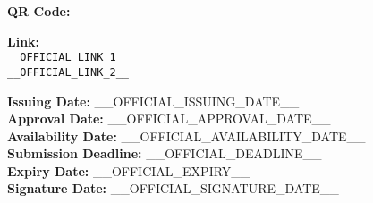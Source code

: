 \begin{tcolorbox}[colback=white, colframe=black, boxrule=0.5pt]
\noindent
\textbf{QR Code:} \\

\vspace{0.5cm}

\noindent
{\normalsize\textbf{Link:} }\\
\texttt{__OFFICIAL_LINK_1__} \\
\texttt{__OFFICIAL_LINK_2__} \\


\vspace{0.5cm}

\noindent

\begin{multicols}{2}
\normalsize
\textbf{Issuing Date:} __OFFICIAL_ISSUING_DATE__ \\
\textbf{Approval Date:} __OFFICIAL_APPROVAL_DATE__ \\
\textbf{Availability Date:} __OFFICIAL_AVAILABILITY_DATE__ \\

\textbf{Submission Deadline:} __OFFICIAL_DEADLINE__ \\
\textbf{Expiry Date:} __OFFICIAL_EXPIRY__ \\
\textbf{Signature Date:} __OFFICIAL_SIGNATURE_DATE__ \\
\end{multicols}

\end{tcolorbox}

\clearpage